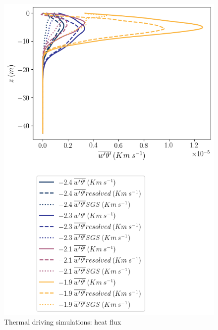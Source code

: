 \begin{figure}
\begin{minipage}{0.5\textwidth}
        \includegraphics[trim={0 10cm 0 0},clip, width=\textwidth]{Figures/heatflux_cmp_dT_48hr_tav1_z_profile.png}
    \end{minipage}
    \caption{Thermal driving simulations: heat flux}
    \label{fig:Heatflux_profiles}
\end{figure}